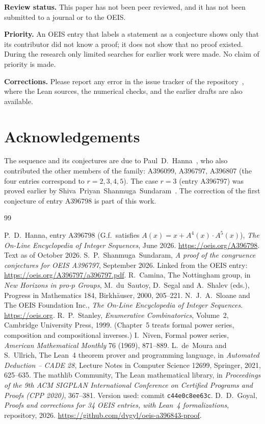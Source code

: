 \documentclass[11pt,a4paper]{article}
\theoremstyle{definition}
\theoremstyle{remark}
\newcommand{\para}[1]{\par\medskip\noindent\textbf{#1}\enspace}
\begin{document}
\para{Review status.} This paper has not been peer reviewed, and it has not been submitted to a journal or to the OEIS.

\para{Priority.} An OEIS entry that labels a statement as a conjecture shows only that its contributor did not know
a proof; it does not show that no proof existed. During the research only limited searches for earlier work were
made. No claim of priority is made.

\para{Corrections.} Please report any error in the issue tracker of the repository~\cite{repo}, where the Lean
sources, the numerical checks, and the earlier drafts are also available.

\section*{Acknowledgements}
The sequence and its conjectures are due to Paul~D.~Hanna~\cite{oeis}, who also contributed the other members of the
family: A396099, A396797, A396807 (the four entries correspond to $r=2,3,4,5$). The case $r=3$ (entry A396797) was
proved earlier by Shiva~Priyan~Shanmuga~Sundaram~\cite{sundaram}. The correction of the first conjecture of entry A396798 is part of this work.

\begin{thebibliography}{99}\small
\raggedright
{} P.~D.~Hanna, entry A396798 (G.f.\ satisfies $A(x)=x+A^{4}(x)\cdot A^{5}(x)$), \emph{The On-Line Encyclopedia of Integer Sequences}, June 2026. \url{https://oeis.org/A396798}. Text as of October 2026.
 S.~P.~Shanmuga~Sundaram, \emph{A proof of the congruence conjectures for OEIS A396797}, September 2026. Linked from the OEIS entry: \url{https://oeis.org/A396797/a396797.pdf}.
 R.~Camina, The Nottingham group, in \emph{New Horizons in pro-$p$ Groups}, M.~du~Sautoy, D.~Segal and A.~Shalev (eds.), Progress in Mathematics 184, Birkh\"auser, 2000, 205--221.
 N.~J.~A.~Sloane and The OEIS Foundation Inc., \emph{The On-Line Encyclopedia of Integer Sequences}. \url{https://oeis.org}.
 R.~P.~Stanley, \emph{Enumerative Combinatorics}, Volume~2, Cambridge University Press, 1999. (Chapter~5 treats formal power series, composition and compositional inverses.)
 I.~Niven, Formal power series, \emph{American Mathematical Monthly} 76 (1969), 871--889.
 L.~de~Moura and S.~Ullrich, The Lean~4 theorem prover and programming language, in \emph{Automated Deduction -- CADE 28}, Lecture Notes in Computer Science 12699, Springer, 2021, 625--635.
 The mathlib Community, The Lean mathematical library, in \emph{Proceedings of the 9th ACM SIGPLAN International Conference on Certified Programs and Proofs (CPP 2020)}, 367--381. Version used: commit \texttt{c44e0c8ee63c}.
 D.~D.~Goyal, \emph{Proofs and corrections for 34 OEIS entries, with Lean~4 formalizations}, repository, 2026. \url{https://github.com/dvgyl/oeis-a396843-proof}.
\end{thebibliography}
\end{document}
